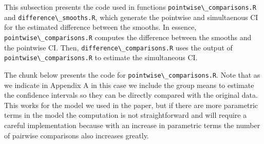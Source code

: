 \documentclass[
]{article}
\newcommand{\passthrough}[1]{#1}
\begin{document}
This subsection presents the code used in functions \passthrough{\lstinline!pointwise\_comparisons.R!} and \passthrough{\lstinline!difference\_smooths.R!}, which generate the pointwise and simultaenous CI for the estimated difference between the smooths. In essence, \passthrough{\lstinline!pointwise\_comparisons.R!} computes the difference between the smooths and the pointwise CI. Then, \passthrough{\lstinline!difference\_comparisons.R!} uses the output of \passthrough{\lstinline!pointwise\_comparisons.R!} to estimate the simultaneous CI.

The chunk below presents the code for \passthrough{\lstinline!pointwise\_comparisons.R!}. Note that as we indicate in Appendix A in this case we include the group means to estimate the confidence intervals so they can be directly compared with the original data. This works for the model we used in the paper, but if there are more parametric terms in the model the computation is not straightforward and will require a careful implementation because with an increase in parametric terms the number of pairwise comparisons also increases greatly.
\end{document}
